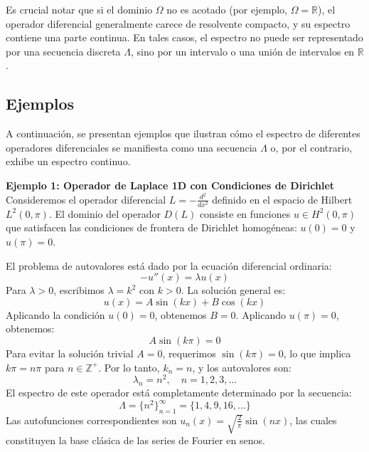 \documentclass[a4paper]{article}
\begin{document}
Es crucial notar que si el dominio $\Omega$ no es acotado (por ejemplo, $\Omega = \mathbb{R}$), el operador diferencial generalmente carece de resolvente compacto, y su espectro contiene una parte continua. En tales casos, el espectro no puede ser representado por una secuencia discreta $\Lambda$, sino por un intervalo o una unión de intervalos en $\mathbb{R}$.

\subsection{Ejemplos}

A continuación, se presentan ejemplos que ilustran cómo el espectro de diferentes operadores diferenciales se manifiesta como una secuencia $\Lambda$ o, por el contrario, exhibe un espectro continuo.

\textbf{Ejemplo 1: Operador de Laplace 1D con Condiciones de Dirichlet}
Consideremos el operador diferencial $L = -\frac{d^2}{dx^2}$ definido en el espacio de Hilbert $L^2(0, \pi)$. El dominio del operador $D(L)$ consiste en funciones $u \in H^2(0, \pi)$ que satisfacen las condiciones de frontera de Dirichlet homogéneas: $u(0) = 0$ y $u(\pi) = 0$.

El problema de autovalores está dado por la ecuación diferencial ordinaria:
$$ -u''(x) = \lambda u(x) $$
Para $\lambda > 0$, escribimos $\lambda = k^2$ con $k > 0$. La solución general es:
$$ u(x) = A \sin(kx) + B \cos(kx) $$
Aplicando la condición $u(0) = 0$, obtenemos $B = 0$. Aplicando $u(\pi) = 0$, obtenemos:
$$ A \sin(k\pi) = 0 $$
Para evitar la solución trivial $A = 0$, requerimos $\sin(k\pi) = 0$, lo que implica $k\pi = n\pi$ para $n \in \mathbb{Z}^+$. Por lo tanto, $k_n = n$, y los autovalores son:
$$ \lambda_n = n^2, \quad n = 1, 2, 3, \dots $$
El espectro de este operador está completamente determinado por la secuencia:
$$ \Lambda = \{n^2\}_{n=1}^{\infty} = \{1, 4, 9, 16, \dots\} $$
Las autofunciones correspondientes son $u_n(x) = \sqrt{\frac{2}{\pi}} \sin(nx)$, las cuales constituyen la base clásica de las series de Fourier en senos.
\end{document}
